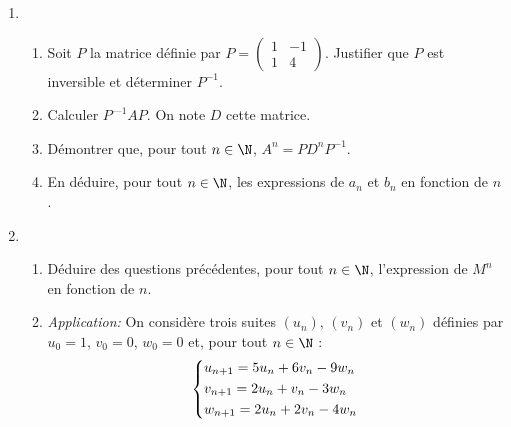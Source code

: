 \documentclass[a4paper]{article}
\begin{document}
\begin{exercice}{}{}
\begin{enumerate}
    \item \begin{enumerate}
        \item Soit $P$ la matrice définie par $P = \begin{pmatrix} 1 & -1 \\ 1 & 4 \end{pmatrix}$. Justifier que $P$ est inversible et déterminer $P^{-1}$.
        \item Calculer $P^{—1}AP$. On note $D$ cette matrice.
        \item Démontrer que, pour tout $n\in\N$, $A^n=PD^nP^{-1}$.
        \item En déduire, pour tout $n\in\N$, les expressions de $a_n$ et $b_n$ en fonction de $n$.
    \end{enumerate}    
    
    
    \item \begin{enumerate}
        \item Déduire des questions précédentes, pour tout $n\in\N$, l'expression de $M^n$ en fonction de $n$.
        \item \textit{Application:} On considère trois suites $(u_n)$, $(v_n)$ et $(w_n)$ définies par $u_0=1$, $v_0=0$, $w_0=0$ et, pour tout $n\in\N$ :
        $$\begin{dcases}
            u_{n+1}=5u_n+6v_n-9w_n\\
            v_{n+1}=2u_n+v_n-3w_n\\
            w_{n+1}=2u_n+2v_n-4w_n\\
        \end{dcases}$$
    \end{enumerate}
\end{enumerate}

\end{exercice}
\end{document}
